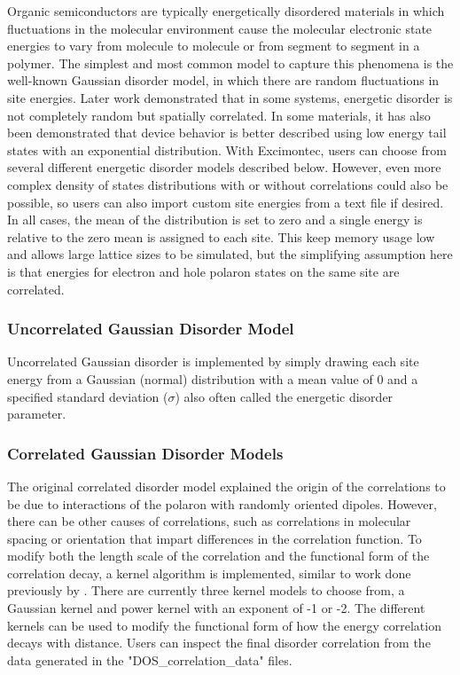 \documentclass[%
 reprint,onecolumn,notitlepage,
superscriptaddress,longbibliography,
 amsmath,amssymb,
 aps,rmp,floatfix,
]{revtex4-1}
\begin{document}
Organic semiconductors are typically energetically disordered materials in which fluctuations in the molecular environment cause the molecular electronic state energies to vary from molecule to molecule or from segment to segment in a polymer.
The simplest and most common model to capture this phenomena is the well-known Gaussian disorder model, in which there are random fluctuations in site energies.\cite{baessler1993pssb}
Later work demonstrated that in some systems, energetic disorder is not completely random but spatially correlated.\cite{gartstein1995cpl,novikov1998prl}
In some materials, it has also been demonstrated that device behavior is better described using low energy tail states with an exponential distribution.\cite{vissenberg1998prb,nelson2003prb,mackenzie2011jpcc}
With Excimontec, users can choose from several different energetic disorder models described below.
However, even more complex density of states distributions with or without correlations could also be possible, so users can also import custom site energies from a text file if desired.
In all cases, the mean of the distribution is set to zero and a single energy is relative to the zero mean is assigned to each site.
This keep memory usage low and allows large lattice sizes to be simulated, but the simplifying assumption here is that energies for electron and hole polaron states on the same site are correlated.

\subsubsection{Uncorrelated Gaussian Disorder Model}

Uncorrelated Gaussian disorder is implemented by simply drawing each site energy from a Gaussian (normal) distribution with a mean value of 0 and a specified standard deviation ($\sigma$) also often called the energetic disorder parameter. 

\subsubsection{Correlated Gaussian Disorder Models}

The original correlated disorder model explained the origin of the correlations to be due to interactions of the polaron with randomly oriented dipoles.
However, there can be other causes of correlations, such as correlations in molecular spacing or orientation that impart differences in the correlation function.\cite{kordt2014jctc}  
To modify both the length scale of the correlation and the functional form of the correlation decay, a kernel algorithm is implemented, similar to work done previously by \citeauthor{gartstein1995cpl}.\cite{gartstein1995cpl}
There are currently three kernel models to choose from, a Gaussian kernel and power kernel with an exponent of -1  or -2.
The different kernels can be used to modify the functional form of how the energy correlation decays with distance.
Users can inspect the final disorder correlation from the data generated in the "DOS\_correlation\_data" files.
\end{document}

